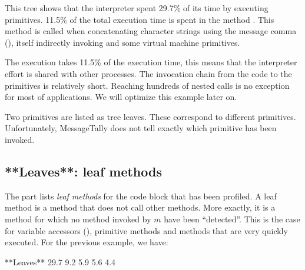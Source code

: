\documentclass[a4paper,10pt,twoside]{book}
\begin{document}
This tree shows that the interpreter spent 29.7\% of its time by executing primitives. 11.5\% of the total execution time is spent in the method . This method is called when concatenating character strings using the message comma (\ct{,}), itself indirectly invoking  and some virtual machine primitives.

The execution takes 11.5\% of the execution time, this means that the interpreter effort is shared with other processes. The invocation chain from the code to the primitives is relatively short. Reaching hundreds of nested calls is no exception for most of applications. We will optimize this example later on.

Two primitives are listed as tree leaves. These correspond to different primitives. Unfortunately, MessageTally does not tell exactly which primitive has been invoked.

\subsection{**Leaves**: leaf methods}

The  part lists \emph{leaf methods} for the code block that has been profiled. A leaf method is a method that does not call other methods. More exactly, it is a method  for which no method invoked by $m$ have been ``detected''. This is the case for variable accessors (\eg  {}), primitive methods and methods that are very quickly executed. For the previous example, we have:

\begin{code}

**Leaves**
29.7%
9.2%
5.9%
5.6%
4.4%
\end{code}
\end{document}
